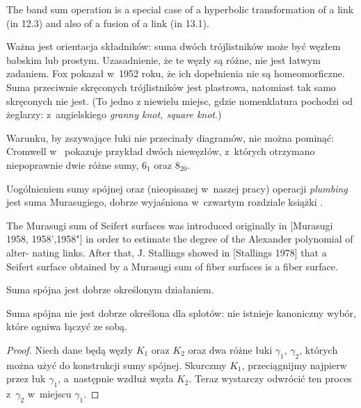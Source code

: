 \begin{tobedone}
The band sum operation is a special case of a hyperbolic transformation of a link (in 12.3) and also of a fusion of a link (in 13.1).
\end{tobedone}

Ważna jest orientacja składników: suma dwóch trójlistników może być węzłem babskim lub prostym.
Uzasadnienie, że te węzły są różne, nie jest łatwym zadaniem.
Fox pokazał w~1952 roku, że ich dopełnienia nie są homeomorficzne.
Suma przeciwnie skręconych trójlistników jest plastrowa, natomiast tak samo skręconych nie jest.
(To jedno z niewielu miejsc, gdzie nomenklatura pochodzi od żeglarzy: z~angielskiego \emph{granny knot, square knot}.)

Warunku, by zszywające łuki nie przecinały diagramów, nie można pominąć: Cromwell w~\cite[s.90]{cromwell04} pokazuje przykład dwóch niewęzłów, z~których otrzymano niepoprawnie dwie różne sumy, $6_1$ oraz $8_{20}$.

Uogólnieniem sumy spójnej oraz (nieopisanej w~naszej pracy) operacji \emph{plumbing} jest suma Murasugiego, dobrze wyjaśniona w~czwartym rozdziale książki \cite{kawauchi96}.

\begin{tobedone}
The Murasugi sum of Seifert surfaces was introduced originally in [Murasugi 1958, 1958',1958"] in order to estimate the degree of the Alexander polynomial of alter- nating links. After that, J. Stallings showed in [Stallings 1978] that a Seifert surface obtained by a Murasugi sum of fiber surfaces is a fiber surface.
\end{tobedone}


\begin{proposition}
    Suma spójna jest dobrze określonym działaniem.
\end{proposition}

Suma spójna nie jest dobrze określona dla splotów:
nie istnieje kanoniczny wybór, które ogniwa łączyć ze sobą.

\begin{proof}
    Niech dane będą węzły $K_1$ oraz $K_2$
    oraz dwa różne łuki $\gamma_1$, $\gamma_2$,
    których można użyć do konstrukcji sumy spójnej.
    Skurczmy $K_1$, przeciągnijmy najpierw przez łuk $\gamma_1$, a~następnie wzdłuż węzła $K_2$.
    Teraz wystarczy odwrócić ten proces z~$\gamma_2$ w~miejscu $\gamma_1$.
\end{proof}

